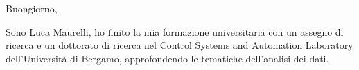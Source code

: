 \documentclass[10pt]{article}
\begin{document}








Buongiorno,

Sono Luca Maurelli, ho finito la mia formazione universitaria con un assegno di ricerca e un dottorato di ricerca nel Control Systems and Automation Laboratory dell'Università di Bergamo, approfondendo le tematiche dell'analisi dei dati.
\end{document}
